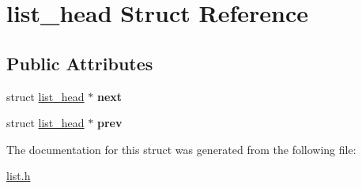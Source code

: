 \hypertarget{structlist__head}{\section{list\-\_\-head \-Struct \-Reference}
\label{structlist__head}
}
\subsection*{\-Public \-Attributes}
\begin{DoxyCompactItemize}
\item 
\hypertarget{structlist__head_ac3b0ff0dfb978a0cfbdad6b9d19cdcfe}{struct \hyperlink{structlist__head}{list\-\_\-head} $\ast$ {\bfseries next}}\label{structlist__head_ac3b0ff0dfb978a0cfbdad6b9d19cdcfe}

\item 
\hypertarget{structlist__head_aaa0eabda8877e1d6de73a33f223ad004}{struct \hyperlink{structlist__head}{list\-\_\-head} $\ast$ {\bfseries prev}}\label{structlist__head_aaa0eabda8877e1d6de73a33f223ad004}

\end{DoxyCompactItemize}


\-The documentation for this struct was generated from the following file\-:\begin{DoxyCompactItemize}
\item 
\hyperlink{list_8h}{list.\-h}\end{DoxyCompactItemize}
